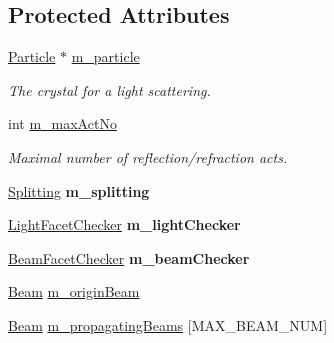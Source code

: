 \subsection*{Protected Attributes}
\begin{DoxyCompactItemize}
\item 
\mbox{\label{class_scattering_aabab038d88c737bb87dd777175b9d541}} 
\mbox{\hyperlink{class_particle}{Particle}} $\ast$ \mbox{\hyperlink{class_scattering_aabab038d88c737bb87dd777175b9d541}{m\+\_\+particle}}
\begin{DoxyCompactList}\small\item\em The crystal for a light scattering. \end{DoxyCompactList}\item 
\mbox{\label{class_scattering_a208510c2d17cdcf221d372ef09441c61}} 
int \mbox{\hyperlink{class_scattering_a208510c2d17cdcf221d372ef09441c61}{m\+\_\+max\+Act\+No}}
\begin{DoxyCompactList}\small\item\em Maximal number of reflection/refraction acts. \end{DoxyCompactList}\item 
\mbox{\label{class_scattering_aa4535b7a8928911c533fb4f6f026e75d}} 
\mbox{\hyperlink{class_splitting}{Splitting}} {\bfseries m\+\_\+splitting}
\item 
\mbox{\label{class_scattering_a807c34a5a7fdf1cf3bb9939b06d1d063}} 
\mbox{\hyperlink{class_light_facet_checker}{Light\+Facet\+Checker}} {\bfseries m\+\_\+light\+Checker}
\item 
\mbox{\label{class_scattering_ad211279d6de0e1e825a44c28927b6acc}} 
\mbox{\hyperlink{class_beam_facet_checker}{Beam\+Facet\+Checker}} {\bfseries m\+\_\+beam\+Checker}
\item 
\mbox{\hyperlink{class_beam}{Beam}} \mbox{\hyperlink{class_scattering_a82f0c3297cbde80cd091a503428f2dc5}{m\+\_\+origin\+Beam}}
\item 
\mbox{\label{class_scattering_adac874d581f21d2e90eb8004e50f3086}} 
\mbox{\hyperlink{class_beam}{Beam}} \mbox{\hyperlink{class_scattering_adac874d581f21d2e90eb8004e50f3086}{m\+\_\+propagating\+Beams}} \mbox{[}M\+A\+X\+\_\+\+B\+E\+A\+M\+\_\+\+N\+UM\mbox{]}

\end{DoxyCompactItemize}
